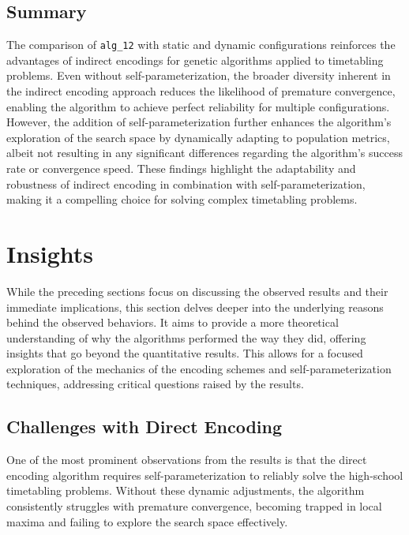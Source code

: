 \documentclass[english,examples]{isasthesis}
\begin{document}
\subsection{Summary}
The comparison of \texttt{alg\_12} with static and dynamic configurations
reinforces the advantages of indirect encodings for genetic algorithms applied
to timetabling problems. Even without self-parameterization, the broader
diversity inherent in the indirect encoding approach reduces the likelihood
of premature convergence, enabling the algorithm to achieve perfect reliability
for multiple configurations. However, the addition of self-parameterization
further enhances the algorithm's exploration of the search space by dynamically
adapting to population metrics, albeit not resulting in any significant
differences regarding the algorithm's success rate or convergence speed.
These findings highlight the adaptability and robustness of indirect encoding
in combination with self-parameterization, making it a compelling choice for
solving complex timetabling problems.

\section{Insights}
While the preceding sections focus on discussing the observed results and
their immediate implications, this section delves deeper into the underlying
reasons behind the observed behaviors. It aims to provide a more theoretical
understanding of why the algorithms performed the way they did, offering
insights that go beyond the quantitative results. This allows for a focused
exploration of the mechanics of the encoding schemes and self-parameterization
techniques, addressing critical questions raised by the results.

\subsection{Challenges with Direct Encoding}
One of the most prominent observations from the results is that the direct
encoding algorithm requires self-parameterization to reliably solve the
high-school timetabling problems. Without these dynamic adjustments, the
algorithm consistently struggles with premature convergence, becoming trapped
in local maxima and failing to explore the search space effectively.
\end{document}
